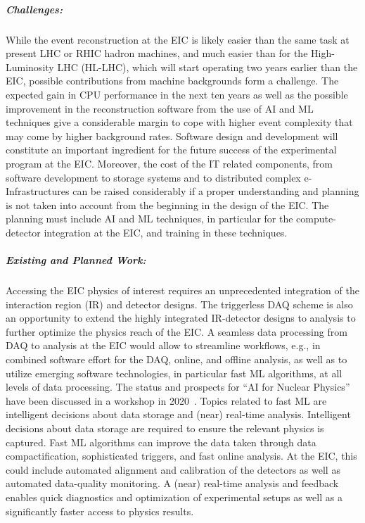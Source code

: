 \subparagraph*{Challenges:}
        While the event reconstruction at the EIC is likely easier than the same task at present LHC or RHIC hadron machines, and much easier than for the High-Luminosity LHC (HL-LHC), which will start operating two years earlier than the EIC, possible contributions from machine backgrounds form a challenge. The expected gain in CPU performance in the next ten years as well as the possible improvement in the reconstruction software from the use of AI and ML techniques give a considerable margin to cope with higher event complexity that may come by higher background rates. Software design and development will constitute an important ingredient for the future success of the experimental program at the EIC. Moreover, the cost of the IT related components, from software development to storage systems and to distributed complex e-Infrastructures can be raised considerably if a proper understanding and planning is not taken into account from the beginning in the design of the EIC. The planning must include AI and ML techniques, in particular for the compute-detector integration at the EIC, and training in these techniques. 
        
\subparagraph*{Existing and Planned Work:}
        
         Accessing the EIC physics of interest requires an unprecedented integration of the interaction region (IR) and detector designs. The triggerless DAQ scheme is also an opportunity to extend the highly integrated IR-detector designs to analysis to further optimize the physics reach of the EIC. A seamless data processing from DAQ to analysis at the EIC would allow to streamline workflows, e.g., in combined software effort for the DAQ, online, and offline analysis, as well as to utilize emerging software technologies, in particular fast ML algorithms, at all levels of data processing. The status and prospects for “AI for Nuclear Physics” have been discussed in a workshop in 2020~\cite{Bedaque:2020pct}. Topics related to fast ML are intelligent decisions about data storage and (near) real-time analysis. Intelligent decisions about data storage are required to ensure the relevant physics is captured. Fast ML algorithms can improve the data taken through data compactification, sophisticated triggers, and fast online analysis. At the EIC, this could include automated alignment and calibration of the detectors as well as automated data-quality monitoring. A (near) real-time analysis and feedback enables quick diagnostics and optimization of experimental setups as well as a significantly faster access to physics results. 
         
